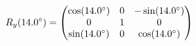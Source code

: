 \documentclass[preview]{standalone}
\begin{document}
\begin{align*}
\special{dvisvgm:raw <g id='unique000'>}R_y(14.0^\circ) = \begin{pmatrix} \cos(14.0^\circ) & 0 & -\sin(14.0^\circ) \\ 0 & 1 & 0 \\ \sin(14.0^\circ) & 0 & \cos(14.0^\circ) \end{pmatrix}\special{dvisvgm:raw </g>}
\end{align*}
\end{document}
